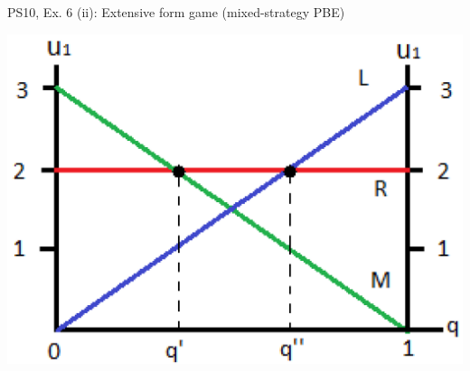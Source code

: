 \begin{frame}{PS10, Ex. 6 (ii): Extensive form game (mixed-strategy PBE)}
\begin{multicols}{2}
\begin{figure}[!h]
      \end{figure}
      \includegraphics[width=1.1\columnwidth]{figures/Gibbons_4_2_E[u]}
      \vfill\null
    \end{multicols}
\end{frame}
